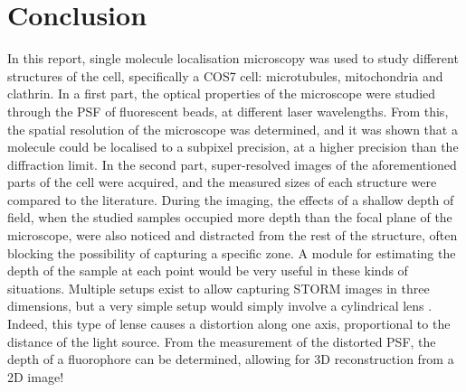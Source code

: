 \section{Conclusion}
In this report, single molecule localisation microscopy was used to study different structures of the cell, specifically a COS7 cell: microtubules, mitochondria and clathrin. In a first part, the optical properties of the microscope were studied through the PSF of fluorescent beads, at different laser wavelengths. From this, the spatial resolution of the microscope was determined, and it was shown that a molecule could be localised to a subpixel precision, at a higher precision than the diffraction limit. In the second part, super-resolved images of the aforementioned parts of the cell were acquired, and the measured sizes of each structure were compared to the literature.
During the imaging, the effects of a shallow depth of field, when the studied samples occupied more depth than the focal plane of the microscope, were also noticed and distracted from the rest of the structure, often blocking the possibility of capturing a specific zone. A module for estimating the depth of the sample at each point would be very useful in these kinds of situations. Multiple setups exist to allow capturing STORM images in three dimensions, but a very simple setup would simply involve a cylindrical lens \cite{jimenez_about_2020}. Indeed, this type of lense causes a distortion along one axis, proportional to the distance of the light source. From the measurement of the distorted PSF, the depth of a fluorophore can be determined, allowing for 3D reconstruction from a 2D image!